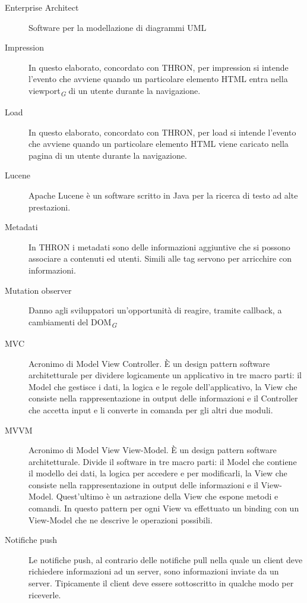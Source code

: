 \documentclass[a4paper, 12pt, twoside, openright]{book}
\newcommand{\gloss}[1]{#1\textsubscript{\textit{\tiny{G}}}}
\begin{document}
\begin {description}
\item[Enterprise Architect]
Software per la modellazione di diagrammi UML

\item[Impression]
In questo elaborato, concordato con THRON, per impression si intende l'evento che avviene quando un particolare elemento HTML entra nella \gloss{viewport} di un utente durante la navigazione.

\item[Load]
In questo elaborato, concordato con THRON, per load si intende l'evento che avviene quando un particolare elemento HTML viene caricato nella pagina di un utente durante la navigazione.
\item[Lucene]
Apache Lucene è un software scritto in Java per la ricerca di testo ad alte prestazioni.

\item[Metadati]
In THRON i metadati sono delle informazioni aggiuntive che si possono associare a contenuti ed utenti. Simili alle tag servono per arricchire con informazioni.
\item[Mutation observer]
Danno agli sviluppatori un'opportunità di reagire, tramite callback, a cambiamenti del \gloss{DOM}
\item[MVC]
Acronimo di Model View Controller. \`{E} un design pattern software architetturale per dividere logicamente un applicativo in tre macro parti: il Model che gestisce i dati, la logica e le regole dell'applicativo, la View che consiste nella rappresentazione in output delle informazioni e il Controller che accetta input e li converte in comanda per gli altri due moduli.
\item[MVVM]
Acronimo di Model View View-Model. \`{E} un design pattern software architetturale. Divide il software in tre macro parti: il Model che contiene il modello dei dati, la logica per accedere e per modificarli, la View che consiste nella rappresentazione in output delle informazioni e il View-Model. Quest'ultimo è un astrazione della View che espone metodi e comandi. In questo pattern per ogni View va effettuato un binding con un View-Model che ne descrive le operazioni possibili.

\item[Notifiche push]
Le notifiche push, al contrario delle notifiche pull nella quale un client deve richiedere informazioni ad un server, sono informazioni inviate da un server. Tipicamente il client deve essere sottoscritto in qualche modo per riceverle.


\end{description}
\end{document}
